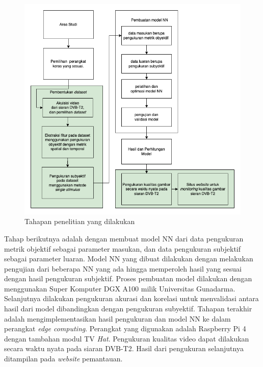 \begin{figure}[H]
	\vspace{-0.1cm}
	\begin{center}
		\includegraphics[width=1\columnwidth]{bab3/Gambar/tahapan-penelitian2-1.png}
	\end{center}
	\vspace{-0.2cm}
	\caption{Tahapan penelitian yang dilakukan} \label{tahapan-penelitian}
\end{figure}

Tahap berikutnya adalah dengan membuat model NN dari data pengukuran metrik objektif sebagai parameter masukan, dan data pengukuran subjektif sebagai parameter luaran. Model NN yang dibuat dilakukan dengan melakukan pengujian dari beberapa NN yang ada hingga memperoleh hasil yang sesuai dengan hasil pengukuran subjektif. Proses pembuatan model dilakukan dengan menggunakan Super Komputer DGX A100 milik Universitas Gunadarma. Selanjutnya dilakukan pengukuran akurasi dan korelasi untuk menvalidasi antara hasil dari model dibandingkan dengan pengukuran subyektif. Tahapan terakhir adalah mengimplementasikan hasil pengukuran dan model NN ke dalam perangkat \textit{edge computing}. Perangkat yang digunakan adalah Raspberry Pi 4 dengan tambahan  modul TV \textit{Hat}. Pengukuran kualitas video dapat dilakukan secara waktu nyata pada siaran DVB-T2. Hasil dari pengukuran selanjutnya ditampilan  pada \textit{website} pemantauan.



